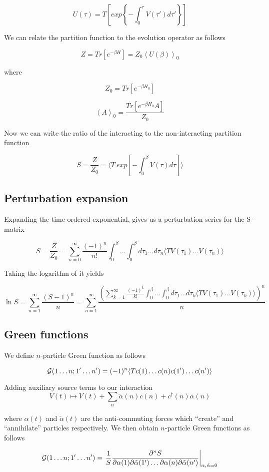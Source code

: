 \[ U(\tau) = T\left[exp\left\{-\int_{0}^{\tau}V(\tau')d\tau'\right\}\right] \]

We can relate the partition function to the evolution operator as follows

\[ Z = Tr\left[e^{-\beta H}\right] = Z_0\left<U(\beta)\right>_0 \]

where 

\[ Z_0 = Tr\left[e^{-\beta H_0}\right] \]

\[ \left<A\right>_0 = \frac{Tr\left[e^{-\beta H_0}A\right]}{Z_0} \]

Now we can write the ratio of the interacting to the non-interacting partition function

\[ S = \frac{Z}{Z_0} = \langle T\ exp\left[-\int_{0}^{\beta}V(\tau)d\tau\right]\rangle \]

\subsection{Perturbation expansion}
Expanding the time-ordered exponential, gives us a perturbation series for the S-matrix

\[ S = \frac{Z}{Z_0} = \sum_{n=0}^{\infty}\frac{(-1)^n}{n!}\int_{0}^{\beta}\dots\int_{0}^{\beta} d\tau_1\dots d\tau_n 
    \langle T V(\tau_1)\dots V(\tau_n) \rangle \]

Taking the logarithm of it yields

\[ \ln{S} = \sum_{n=1}^{\infty}\frac{(S-1)^n}{n} = \sum_{n=1}^{\infty}
  \frac{(\sum_{k=1}^{\infty}\frac{(-1)^k}{k!}\int_{0}^{\beta}\dots\int_{0}^{\beta} d\tau_1\dots d\tau_k 
    \langle T V(\tau_1)\dots V(\tau_k) \rangle)^n}{n} \]

\subsection{Green functions}
We define $n$-particle Green function as follows

\[ \mathcal{G}(1\dots n;1'\dots n') = (-1)^n\langle T c(1)\dots c(n)c(1')\dots c(n')\rangle \]

Adding auxiliary source terms to our interaction
\[ V(t) \mapsto V(t) + \sum_n \tilde{\alpha}(n)c(n)+c^\dagger(n) \alpha(n) \] 

where $\alpha(t)$ and $\tilde{\alpha}(t)$ are the anti-commuting forces which ``create'' and ``annihilate'' particles respectively.
We then obtain $n$-particle Green functions as follows

\[ \mathcal{G}(1\dots n;1'\dots n') = \left.\frac{1}{S}\frac{\partial^n S}{\partial\alpha(1)\partial\tilde{\alpha}(1')\dots \partial\alpha(n)\partial\tilde{\alpha}(n')}\right|_{\alpha,\tilde{\alpha}=0} \]

